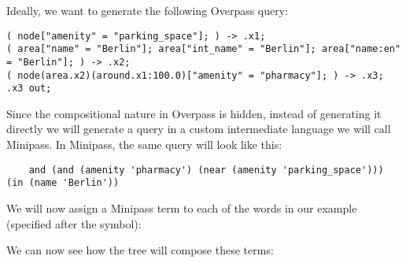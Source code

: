 \documentclass[main.tex]{subfiles}
\begin{document}
Ideally, we want to generate the following Overpass query:
\begin{lstwrap}\begin{lstlisting}
( node["amenity" = "parking_space"]; ) -> .x1;
( area["name" = "Berlin"]; area["int_name" = "Berlin"]; area["name:en" = "Berlin"]; ) -> .x2;
( node(area.x2)(around.x1:100.0)["amenity" = "pharmacy"]; ) -> .x3;
.x3 out;
\end{lstlisting}\end{lstwrap}

Since the compositional nature in Overpass is hidden, instead of generating
it directly we will generate a query in a custom intermediate language we will
call Minipass. In Minipass, the same query will look like this:
\begin{lstwrap}\begin{lstlisting}
    and (and (amenity 'pharmacy') (near (amenity 'parking_space'))) (in (name 'Berlin'))
\end{lstlisting}\end{lstwrap}

We will now assign a Minipass term to each of the words in our example (specified
after the  symbol):

We can now see how the tree will compose these terms:
\end{document}
